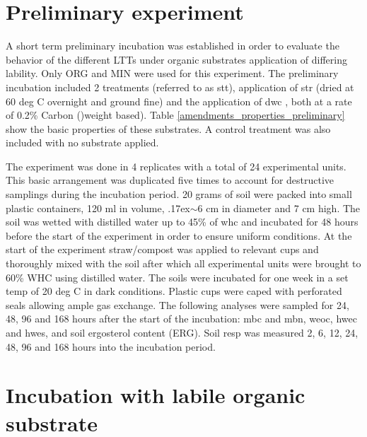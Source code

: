\section{Preliminary experiment}

	A short term preliminary incubation was established in order to evaluate the behavior of the different LTTs under organic substrates application of differing lability.  Only ORG and MIN were used for this experiment.  The preliminary incubation included 2 treatments (referred to as \gls{stt}), application of \gls{str} (dried at 60 deg C overnight and ground fine) and the application of \gls{dwc} , both at a rate of 0.2\% Carbon ()weight based). Table \ref{amendments_properties_preliminary} show the basic properties of these substrates. A control treatment was also included with no substrate applied.

		

	\noindent The experiment was done in 4 replicates with a total of 24 experimental units. This basic arrangement was duplicated five times to account for destructive samplings during the incubation period. 20 grams of soil were packed into small plastic containers, 120 ml in volume, {\raise.17ex\hbox{$\scriptstyle\mathtt{\sim}$}}6 cm in diameter and 7 cm high. The soil was wetted with distilled water up to 45\% of \gls{whc} and incubated for 48 hours before the start of the experiment in order to ensure uniform conditions. At the start of the experiment straw/compost was applied to relevant cups and thoroughly mixed with the soil after which all experimental units were brought to 60\% WHC using distilled water. The soils were incubated for one week in a set temp of 20 deg C in dark conditions. Plastic cups were caped with perforated seals allowing ample gas exchange. The following analyses were sampled for 24, 48, 96 and 168 hours after the start of the incubation: \gls{mbc} and \gls{mbn}, \gls{weoc}, \gls{hwec} and \gls{hwes},  and soil ergosterol content (ERG). Soil \gls{resp} was measured 2, 6, 12, 24, 48, 96 and 168 hours into the incubation period.


\section{Incubation with labile organic substrate}

